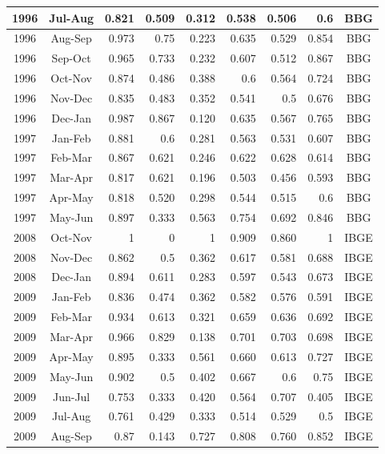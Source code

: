 \documentclass[11pt]{article}
\begin{document}
\begin{table}[H]
{\begin{tabular}{|c|c|r|r|r|r|r|r|c|}
1996 & Jul-Aug & 0.821 & 0.509 & 0.312 & 0.538 & 0.506 & 0.6 & BBG \\ \hline
1996 & Aug-Sep & 0.973 & 0.75 & 0.223 & 0.635 & 0.529 & 0.854 & BBG \\ \hline
1996 & Sep-Oct & 0.965 & 0.733 & 0.232 & 0.607 & 0.512 & 0.867 & BBG \\ \hline
1996 & Oct-Nov & 0.874 & 0.486 & 0.388 & 0.6 & 0.564 & 0.724 & BBG \\ \hline
1996 & Nov-Dec & 0.835 & 0.483 & 0.352 & 0.541 & 0.5 & 0.676 & BBG \\ \hline
1996 & Dec-Jan & 0.987 & 0.867 & 0.120 & 0.635 & 0.567 & 0.765 & BBG \\ \hline
1997 & Jan-Feb & 0.881 & 0.6 & 0.281 & 0.563 & 0.531 & 0.607 & BBG \\ \hline
1997 & Feb-Mar & 0.867 & 0.621 & 0.246 & 0.622 & 0.628 & 0.614 & BBG \\ \hline
1997 & Mar-Apr & 0.817 & 0.621 & 0.196 & 0.503 & 0.456 & 0.593 & BBG \\ \hline
1997 & Apr-May & 0.818 & 0.520 & 0.298 & 0.544 & 0.515 & 0.6 & BBG \\ \hline
1997 & May-Jun & 0.897 & 0.333 & 0.563 & 0.754 & 0.692 & 0.846 & BBG \\ \hline
2008 & Oct-Nov & 1 & 0 & 1 & 0.909 & 0.860 & 1 & IBGE \\ \hline
2008 & Nov-Dec & 0.862 & 0.5 & 0.362 & 0.617 & 0.581 & 0.688 & IBGE \\ \hline
2008 & Dec-Jan & 0.894 & 0.611 & 0.283 & 0.597 & 0.543 & 0.673 & IBGE \\ \hline
2009 & Jan-Feb & 0.836 & 0.474 & 0.362 & 0.582 & 0.576 & 0.591 & IBGE \\ \hline
2009 & Feb-Mar & 0.934 & 0.613 & 0.321 & 0.659 & 0.636 & 0.692 & IBGE \\ \hline
2009 & Mar-Apr & 0.966 & 0.829 & 0.138 & 0.701 & 0.703 & 0.698 & IBGE \\ \hline
2009 & Apr-May & 0.895 & 0.333 & 0.561 & 0.660 & 0.613 & 0.727 & IBGE \\ \hline
2009 & May-Jun & 0.902 & 0.5 & 0.402 & 0.667 & 0.6 & 0.75 & IBGE \\ \hline
2009 & Jun-Jul & 0.753 & 0.333 & 0.420 & 0.564 & 0.707 & 0.405 & IBGE \\ \hline
2009 & Jul-Aug & 0.761 & 0.429 & 0.333 & 0.514 & 0.529 & 0.5 & IBGE \\ \hline
2009 & Aug-Sep & 0.87 & 0.143 & 0.727 & 0.808 & 0.760 & 0.852 & IBGE \\ \hline
\end{tabular}
}
\end{table}
\end{document}
